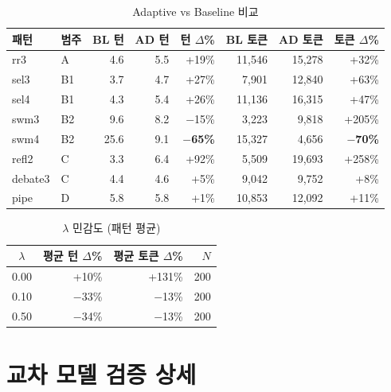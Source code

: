 \documentclass[a4paper,11pt]{article}
\begin{document}
\begin{table}[H]
\centering
\caption{Adaptive vs Baseline 비교}
\label{tab:adaptive-vs-baseline}
{\small
\begin{tabular}{llrrrrrr}
\toprule
패턴 & 범주 & BL 턴 & AD 턴 & 턴 $\Delta$\% & BL 토큰 & AD 토큰 & 토큰 $\Delta$\% \\
\midrule
rr3     & A  & 4.6  & 5.5  & +19\%  & 11,546  & 15,278  & +32\% \\
sel3    & B1 & 3.7  & 4.7  & +27\%  & 7,901   & 12,840  & +63\% \\
sel4    & B1 & 4.3  & 5.4  & +26\%  & 11,136  & 16,315  & +47\% \\
swm3    & B2 & 9.6  & 8.2  & $-$15\% & 3,223  & 9,818   & +205\% \\
swm4    & B2 & 25.6 & 9.1  & \textbf{$-$65\%} & 15,327 & 4,656 & \textbf{$-$70\%} \\
refl2   & C  & 3.3  & 6.4  & +92\%  & 5,509   & 19,693  & +258\% \\
debate3 & C  & 4.4  & 4.6  & +5\%   & 9,042   & 9,752   & +8\% \\
pipe    & D  & 5.8  & 5.8  & +1\%   & 10,853  & 12,092  & +11\% \\
\bottomrule
\end{tabular}
}
\end{table}

\begin{table}[H]
\centering
\caption{$\lambda$ 민감도 (패턴 평균)}
\label{tab:lambda-pattern-avg}
{\small
\begin{tabular}{crrr}
\toprule
$\lambda$ & 평균 턴 $\Delta$\% & 평균 토큰 $\Delta$\% & $N$ \\
\midrule
0.00 & +10\%  & +131\% & 200 \\
0.10 & $-$33\% & $-$13\% & 200 \\
0.50 & $-$34\% & $-$13\% & 200 \\
\bottomrule
\end{tabular}
}
\end{table}

\section{교차 모델 검증 상세}
\label{app:cross-model-details}
\end{document}
